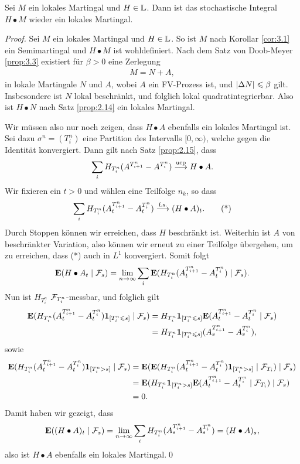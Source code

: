 \begin{theorem}
\label{prop:3.5}
Sei $M$ ein lokales Martingal und $H \in \mathbb{L}$. Dann ist das stochastische
Integral $H \bullet M$ wieder ein lokales Martingal.\fish
\end{theorem}
\begin{proof}
Sei $M$ ein lokales Martingal und $H\in \mathbb{L}$. So ist $M$ nach Korollar
\ref{cor:3.1} ein Semimartingal und $H\bullet M$ ist wohldefiniert. Nach dem
Satz von Doob-Meyer \ref{prop:3.3} existiert für $\beta > 0$ eine Zerlegung
\begin{align*}
M = N+A,
\end{align*}
in lokale Martingale $N$ und $A$, wobei $A$ ein FV-Prozess ist, und $\lvert\Delta
N\rvert \leqslant \beta$ gilt.
Insbesondere ist $N$ lokal beschränkt, und folglich lokal
quadratintegrierbar. Also ist $H\bullet N$ nach Satz \ref{prop:2.14} ein
lokales Martingal.

Wir müssen also nur noch zeigen, dass $H\bullet A$ ebenfalls
ein lokales Martingal ist. Sei dazu $\sigma^n = (T_i^n)$ eine Partition des
Intervalls $[0,\infty)$, welche gegen die Identität konvergiert. Dann gilt nach
Satz \ref{prop:2.15}, dass
\begin{align*}
\sum_{i} H_{T_i^n}(A^{T_{i+1}^n}-A^{T_i^n}) \overset{\text{ucp}}{\longrightarrow} H\bullet A.
\end{align*}
Wir fixieren ein $t > 0$ und wählen eine Teilfolge $n_k$, so dass
\begin{align*}
\sum_{i} H_{T_i^n}(A_t^{T_{i+1}^n}-A_t^{T_i^n}) \overset{\text{f.s.}}{\longrightarrow} (H\bullet A)_t.\tag{*}
\end{align*}
Durch Stoppen können wir erreichen, dass $H$ beschränkt ist. Weiterhin ist 
$A$ von beschränkter Variation, also können wir erneut zu einer Teilfolge
übergehen, um zu erreichen, dass (*) auch in $L^1$ konvergiert. Somit folgt
\begin{align*}
\mathbf{E}(H\bullet A_t \mid \mathcal{F}_s) = \lim\limits_{n\to \infty}
\sum_i 
\mathbf{E} (H_{T_i^n}(A_t^{T_{i+1}^n}-A_t^{T_i^n})\mid \mathcal{F}_s).
\end{align*}
Nun ist $H_{T_i^n}$ $\mathcal{F}_{T_i^n}$-messbar, und folglich gilt
\begin{align*}
\mathbf{E} (H_{T_i^n}(A_t^{T_{i+1}^n}-A_t^{T_i^n})\mathbf{1}_{[T_i^n \leqslant  s]}\mid \mathcal{F}_s)
&= 
H_{T_i^n}\mathbf{1}_{[T_i^n \leqslant  s]} \mathbf{E} (A_t^{T_{i+1}^n}-A_t^{T_i^n}\mid
\mathcal{F}_s)\\
&= 
H_{T_i^n}\mathbf{1}_{[T_i^n \leqslant  s]} (A_s^{T_{i+1}^n}-A_s^{T_i^n}),
\end{align*}
sowie
\begin{align*}
\mathbf{E} (H_{T_i^n}(A_t^{T_{i+1}^n}-A_t^{T_i^n})\mathbf{1}_{[T_i^n >  s]}\mid \mathcal{F}_s)
&=
\mathbf{E} (\mathbf{E}(H_{T_i^n}(A_t^{T_{i+1}^n}-A_t^{T_i^n})\mathbf{1}_{[T_i^n > 
s]}\mid\mathcal{F}_{T_i})\mid \mathcal{F}_s)\\
&= \mathbf{E} (H_{T_i^n}\mathbf{1}_{[T_i^n > 
s]}\mathbf{E}(A_t^{T_{i+1}^n}-A_t^{T_i^n}\mid\mathcal{F}_{T_i})\mid \mathcal{F}_s)\\
&= 0.
\end{align*}
Damit haben wir gezeigt, dass
\begin{align*}
\mathbf{E} ((H\bullet A)_t\mid \mathcal{F}_s) = 
\lim\limits_{n\to \infty}
\sum_i 
H_{T_i^n}(A_s^{T_{i+1}^n}-A_s^{T_i^n})
= (H\bullet A)_s,
\end{align*}
also ist $H\bullet A$ ebenfalls ein lokales Martingal.\qed
\end{proof}

